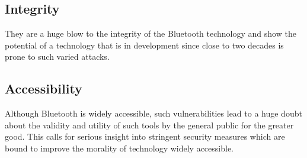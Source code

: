 \documentclass{article}
\begin{document}
\subsection{Integrity}
They are a huge blow to the integrity of the Bluetooth\texttrademark{} technology and show the potential of a technology that is in development since close to two decades is prone to such varied attacks.

\subsection{Accessibility}
Although Bluetooth\texttrademark{} is widely accessible, such vulnerabilities lead to a huge doubt about the validity and utility of such tools by the general public for the greater good. This calls for serious insight into stringent security measures which are bound to improve the morality of technology widely accessible.



\end{document}
